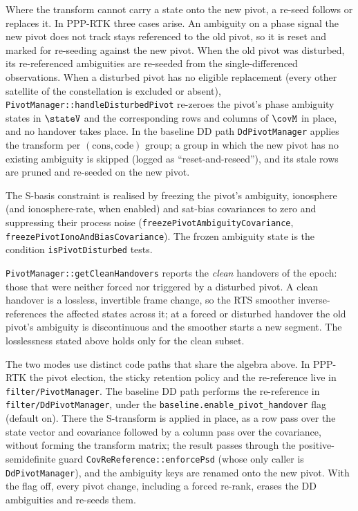 Where the transform cannot carry a state onto the new pivot, a re-seed follows or
replaces it.  In PPP-RTK three cases arise.  An ambiguity on a phase signal the new pivot does not
track stays referenced to the old pivot, so it is reset and marked for re-seeding
against the new pivot.  When the old pivot was disturbed, its re-referenced
ambiguities are re-seeded from the single-differenced observations.  When a
disturbed pivot has no eligible replacement (every other satellite of the
constellation is excluded or absent),
\texttt{PivotManager::handleDisturbedPivot} re-zeroes the pivot's phase ambiguity
states in $\stateV$ and the corresponding rows and columns of $\covM$ in place, and
no handover takes place.  In the baseline DD path \texttt{DdPivotManager} applies the
transform per $(\text{cons},\text{code})$ group; a group in which the new pivot has
no existing ambiguity is skipped (logged as ``reset-and-reseed''), and its stale
rows are pruned and re-seeded on the new pivot.

The S-basis constraint is realised by freezing the pivot's ambiguity, ionosphere
(and ionosphere-rate, when enabled) and sat-bias covariances to zero and suppressing
their process noise (\texttt{freezePivotAmbiguityCovariance},
\texttt{freezePivotIonoAndBiasCovariance}).  The frozen ambiguity state is the
condition \texttt{isPivotDisturbed} tests.

\texttt{PivotManager::getCleanHandovers} reports the \emph{clean} handovers of the
epoch: those that were neither forced nor triggered by a disturbed pivot.  A clean
handover is a lossless, invertible frame change, so the RTS smoother
inverse-references the affected states across it; at a forced or disturbed handover
the old pivot's ambiguity is discontinuous and the smoother starts a new segment.
The losslessness stated above holds only for the clean subset.

The two modes use distinct code paths that share the algebra above.  In PPP-RTK
the pivot election, the sticky retention policy and the re-reference live in
\texttt{filter/PivotManager}.  The baseline DD path performs the re-reference in
\texttt{filter/DdPivotManager}, under the \texttt{baseline.enable\_pivot\_handover}
flag (default on).  There the S-transform is applied in place, as a row pass over
the state vector and covariance followed by a column pass over the covariance,
without forming the transform matrix; the result passes through the
positive-semidefinite guard \texttt{CovReReference::enforcePsd} (whose only caller is \texttt{DdPivotManager}),
and the ambiguity keys are renamed onto the new pivot.  With the flag off, every
pivot change, including a forced re-rank, erases the DD ambiguities and re-seeds
them.

